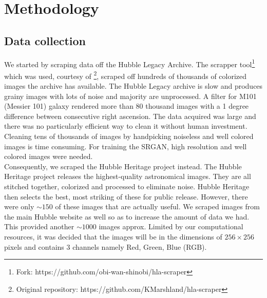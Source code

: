 \documentclass{article} %
\begin{document}
\section{Methodology}
    \subsection{Data collection}
    \hspace*{0.25 in}We started by scraping data off the Hubble Legacy Archive. The scrapper tool\footnote{Fork: https://github.com/obi-wan-shinobi/hla-scraper} which was used, courtesy of \cite{Gao2019astronomical}\footnote{Original repository: https://github.com/KMarshland/hla-scraper}, scraped off hundreds of thousands of colorized images the archive has available. The Hubble Legacy archive is slow and produces grainy images with lots of noise and majority are unprocessed. A filter for M101 (Messier 101) galaxy rendered more than 80 thousand images with a 1 degree difference between consecutive right ascension. The data acquired was large and there was no particularly efficient way to clean it without human investment. Cleaning tens of thousands of images by handpicking noiseless and well colored images is time consuming. For training the SRGAN, high resolution and well colored images were needed.\\
    \hspace*{0.25 in}Consequently, we scraped the Hubble Heritage project instead. The Hubble Heritage project releases the highest-quality astronomical images. They are all stitched together, colorized and processed to eliminate noise. Hubble Heritage then selects the best, most striking of these for public release. However, there were only $\sim150$ of these images that are actually useful. We scraped images from the main Hubble website as well so as to increase the amount of data we had. This provided another $\sim1000$ images approx. Limited by our computational resources, it was decided that the images will be in the dimensions of $256\times 256$ pixels and contains 3 channels namely Red, Green, Blue (RGB).\\
    
\end{document}
